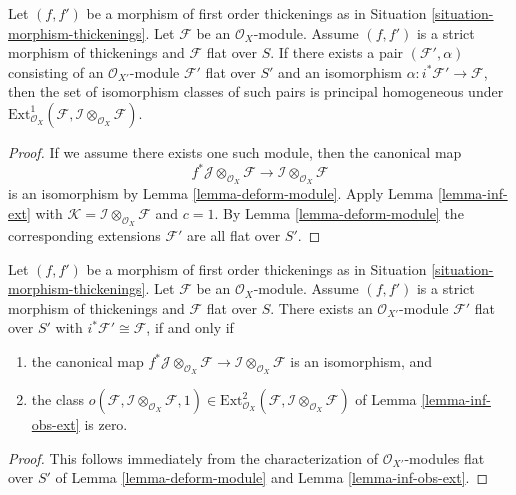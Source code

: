 \begin{lemma}
\label{lemma-inf-ext-rel}
Let $(f, f')$ be a morphism of first order thickenings as in
Situation \ref{situation-morphism-thickenings}.
Let $\mathcal{F}$ be an $\mathcal{O}_X$-module.
Assume $(f, f')$ is a strict morphism of thickenings and
$\mathcal{F}$ flat over $S$. If there exists a pair
$(\mathcal{F}', \alpha)$ consisting of an
$\mathcal{O}_{X'}$-module $\mathcal{F}'$ flat over $S'$ and an isomorphism
$\alpha : i^*\mathcal{F}' \to \mathcal{F}$, then the set of
isomorphism classes of such pairs is principal homogeneous
under
$\text{Ext}^1_{\mathcal{O}_X}(
\mathcal{F}, \mathcal{I} \otimes_{\mathcal{O}_X} \mathcal{F})$.
\end{lemma}

\begin{proof}
If we assume there exists one such module, then the canonical map
$$
f^*\mathcal{J} \otimes_{\mathcal{O}_X} \mathcal{F} \to
\mathcal{I} \otimes_{\mathcal{O}_X} \mathcal{F}
$$
is an isomorphism by Lemma \ref{lemma-deform-module}. Apply
Lemma \ref{lemma-inf-ext} with $\mathcal{K} = 
\mathcal{I} \otimes_{\mathcal{O}_X} \mathcal{F}$
and $c = 1$. By Lemma \ref{lemma-deform-module} the corresponding extensions
$\mathcal{F}'$ are all flat over $S'$.
\end{proof}

\begin{lemma}
\label{lemma-inf-obs-ext-rel}
Let $(f, f')$ be a morphism of first order thickenings as in
Situation \ref{situation-morphism-thickenings}.
Let $\mathcal{F}$ be an $\mathcal{O}_X$-module. Assume
$(f, f')$ is a strict morphism of thickenings
and $\mathcal{F}$ flat over $S$. There exists an
$\mathcal{O}_{X'}$-module $\mathcal{F}'$ flat over $S'$ with
$i^*\mathcal{F}' \cong \mathcal{F}$, if and only if
\begin{enumerate}
\item the canonical map $
f^*\mathcal{J} \otimes_{\mathcal{O}_X} \mathcal{F} \to
\mathcal{I} \otimes_{\mathcal{O}_X} \mathcal{F}$
is an isomorphism, and
\item the class
$o(\mathcal{F}, \mathcal{I} \otimes_{\mathcal{O}_X} \mathcal{F}, 1)
\in \text{Ext}^2_{\mathcal{O}_X}(
\mathcal{F}, \mathcal{I} \otimes_{\mathcal{O}_X} \mathcal{F})$
of Lemma \ref{lemma-inf-obs-ext} is zero.
\end{enumerate}
\end{lemma}

\begin{proof}
This follows immediately from the characterization of
$\mathcal{O}_{X'}$-modules flat over $S'$ of 
Lemma \ref{lemma-deform-module} and
Lemma \ref{lemma-inf-obs-ext}.
\end{proof}






